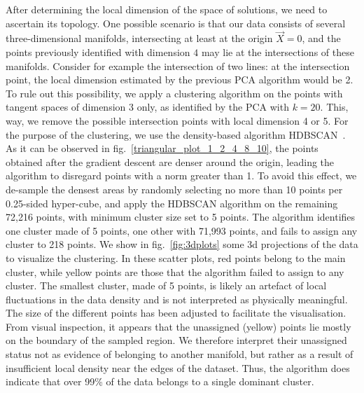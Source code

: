 \documentclass[11pt,a4paper]{article}
\begin{document}
	After determining the local dimension of the space of solutions, we need to ascertain its topology. 
One possible scenario is that our data consists of several three-dimensional manifolds, intersecting at least at the origin $\vec{X}=0$, and the points previously identified with dimension $4$ may lie at the intersections of these manifolds. 
Consider for example the intersection of two lines: at the intersection point, the local dimension estimated by the previous PCA algorithm would be 2. 
To rule out this possibility, we apply a clustering algorithm on the points with tangent spaces of dimension 3 only, as identified by the PCA with $k=20$. 
This, way, we remove the possible intersection points with local dimension 4 or 5. 
For the purpose of the clustering, we use the density-based algorithm HDBSCAN~\cite{10.1007/978-3-642-37456-2_14}. 
As it can be observed in fig.~\ref{triangular_plot_1_2_4_8_10}, the points obtained after the gradient descent are denser around the origin, leading the algorithm to disregard points with a norm greater than 1. 
To avoid this effect, we de-sample the densest areas by randomly selecting no more than 10 points per 0.25-sided hyper-cube, and apply the HDBSCAN algorithm on the remaining 72,216 points, with minimum cluster size set to 5 points. 
The algorithm identifies one cluster made of 5 points, one other with 71,993 points, and fails to assign any cluster to 218 points. We show in fig.~\ref{fig:3dplots} some 3d projections of the data to visualize the clustering. In these scatter plots, red points belong to the main cluster, while yellow points are those that the algorithm failed to assign to any cluster. The smallest cluster, made of 5 points, is likely an artefact of local fluctuations in the data density and is not interpreted as physically meaningful. The size of the different points has been adjusted to facilitate the visualisation. From visual inspection, it appears that the unassigned (yellow) points lie mostly on the boundary of the sampled region. We therefore interpret their unassigned status not as evidence of belonging to another manifold, but rather as a result of insufficient local density near the edges of the dataset. Thus, the algorithm does indicate that over 99\% of the data belongs to a single dominant cluster.
\end{document}
